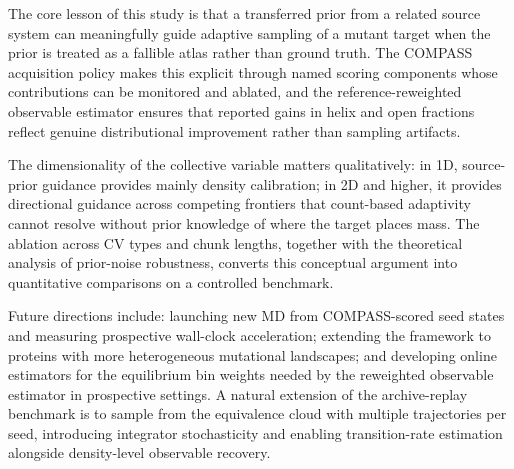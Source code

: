 The core lesson of this study is that a transferred prior from a related source system can meaningfully guide adaptive sampling of a mutant target when the prior is treated as a fallible atlas rather than ground truth.
The COMPASS acquisition policy makes this explicit through named scoring components whose contributions can be monitored and ablated, and the reference-reweighted observable estimator ensures that reported gains in helix and open fractions reflect genuine distributional improvement rather than sampling artifacts.

The dimensionality of the collective variable matters qualitatively: in 1D, source-prior guidance provides mainly density calibration; in 2D and higher, it provides directional guidance across competing frontiers that count-based adaptivity cannot resolve without prior knowledge of where the target places mass.
The ablation across CV types and chunk lengths, together with the theoretical analysis of prior-noise robustness, converts this conceptual argument into quantitative comparisons on a controlled benchmark.

Future directions include: launching new MD from COMPASS-scored seed states and measuring prospective wall-clock acceleration; extending the framework to proteins with more heterogeneous mutational landscapes; and developing online estimators for the equilibrium bin weights needed by the reweighted observable estimator in prospective settings.
A natural extension of the archive-replay benchmark is to sample from the equivalence cloud with multiple trajectories per seed, introducing integrator stochasticity and enabling transition-rate estimation alongside density-level observable recovery.
